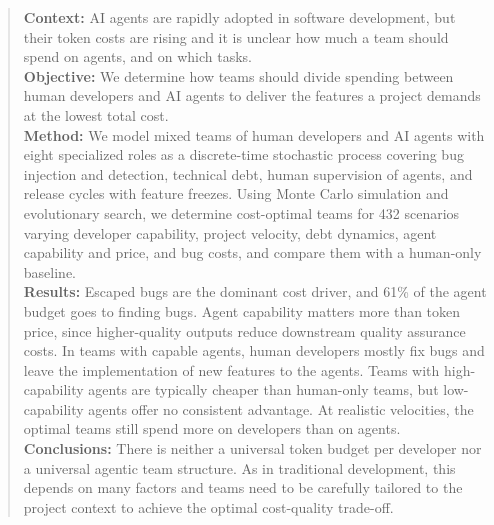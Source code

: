 \begin{abstract}
\textbf{Context:} AI agents are rapidly adopted in software development, but their token costs are rising and it is unclear how much a team should spend on agents, and on which tasks.\\
\textbf{Objective:} We determine how teams should divide spending between human developers and AI agents to deliver the features a project demands at the lowest total cost.\\
\textbf{Method:} We model mixed teams of human developers and AI agents with eight specialized roles as a discrete-time stochastic process covering bug injection and detection, technical debt, human supervision of agents, and release cycles with feature freezes. Using Monte Carlo simulation and evolutionary search, we determine cost-optimal teams for 432 scenarios varying developer capability, project velocity, debt dynamics, agent capability and price, and bug costs, and compare them with a human-only baseline.\\
\textbf{Results:} Escaped bugs are the dominant cost driver, and 61\% of the agent budget goes to finding bugs. Agent capability matters more than token price, since higher-quality outputs reduce downstream quality assurance costs. In teams with capable agents, human developers mostly fix bugs and leave the implementation of new features to the agents. Teams with high-capability agents are typically cheaper than human-only teams, but low-capability agents offer no consistent advantage. At realistic velocities, the optimal teams still spend more on developers than on agents.\\
\textbf{Conclusions:} There is neither a universal token budget per developer nor a universal agentic team structure. As in traditional development, this depends on many factors and teams need to be carefully tailored to the project context to achieve the optimal cost-quality trade-off. 
\end{abstract}

